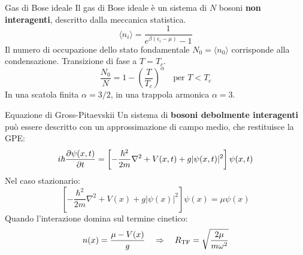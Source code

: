 \documentclass[aspectratio=169]{beamer}
\begin{document}

\begin{frame}{Gas di Bose ideale}
  Il gas di Bose ideale è un sistema di $N$ bosoni \textbf{non interagenti}, descritto dalla meccanica statistica.
  \begin{equation*}
      \langle n_i \rangle = \frac{1}{e^{\beta(\epsilon_i - \mu)}-1}
  \end{equation*}
  \pause
  Il numero di occupazione dello stato fondamentale $N_0 = \langle n_0\rangle$ corrisponde alla condensazione. Transizione di fase a $T = T_c$.
  \begin{equation*}
      \frac{N_0}{N} = 1-\left(\frac{T}{T_c}\right)^\alpha \quad \text{per } T < T_c
  \end{equation*}
  In una scatola finita $\alpha = 3/2$, in una trappola armonica $\alpha = 3$.
\end{frame}

\begin{frame}{Equazione di Gross-Pitaevskii}
  Un sistema di \textbf{bosoni debolmente interagenti} può essere descritto con un approssimazione di campo medio, che restituisce la GPE:
  \begin{equation*}
      i\hbar \pdv{\psi(x,t)}{t} = \left[ 
          -\frac{\hbar^2}{2m}\nabla^2 + V(x,t) + g|\psi(x,t)|^2
      \right] \psi(x,t)
  \end{equation*}
  \pause
  Nel caso stazionario:
  \begin{equation*}
      \left[ 
          -\frac{\hbar^2}{2m}\nabla^2 + V(x) + g|\psi(x)|^2
      \right] \psi(x) = \mu \psi(x)
  \end{equation*}
  Quando l'interazione domina sul termine cinetico:
  \begin{equation*}
      n(x) = \frac{\mu - V(x)}{g} \quad \Rightarrow \quad R_{\rm TF} = \sqrt{\frac{2\mu}{m\omega^2}}
  \end{equation*}
\end{frame}
\end{document}
